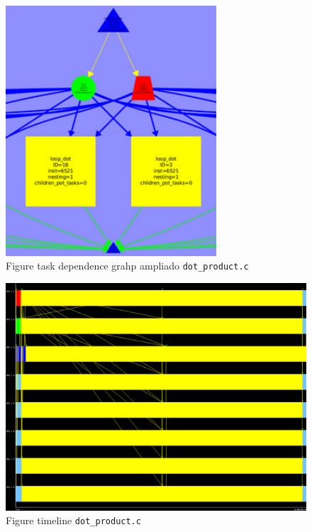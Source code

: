 \documentclass[a4paper,11pt]{article}
\begin{document}
\begin{enumerate}
      \begin{figure}[h!]
        \begin{center}
        \includegraphics[width=0.7\textwidth]{pregunta_8_2.png}
        \caption{Figure task dependence grahp ampliado \texttt{dot\_product.c}}
        \end{center}
      \end{figure}

      \begin{figure}[h!]
        \begin{center}
        \includegraphics[width=1\textwidth]{pregunta_8_3.png}
        \caption{Figure timeline \texttt{dot\_product.c}}
        \end{center}
      \end{figure}
  \end{enumerate}
\clearpage
\end{document}
